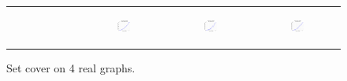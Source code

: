 \begin{figure}[ht]
\begin{tabular}{cccc}
\begin{subfigure}[b]{0.22\textwidth}
			\caption{}
			\label{appfig:validated_CC2G_friendster10M_setcover}
	  \end{subfigure} &
	  \begin{subfigure}[b]{0.22\textwidth}
	  	\includegraphics[width=105pt]{images/validated_CC2G_arabic2005_setcover.pdf}
			\caption{}
			\label{appfig:validated_CC2G_arabic2005_setcover}
	  \end{subfigure} &
	  \begin{subfigure}[b]{0.22\textwidth}
	  	\includegraphics[width=105pt]{images/validated_CC2G_uk2005_setcover.pdf}
			\caption{}
			\label{appfig:validated_CC2G_uk2005_setcover}
	  \end{subfigure} &
	  \begin{subfigure}[b]{0.22\textwidth}
	  	\includegraphics[width=105pt]{images/validated_CC2G_it2004_setcover.pdf}
			\caption{}
			\label{appfig:validated_CC2G_it2004_setcover}
	  \end{subfigure} \\
  \end{tabular}
  \caption{Set cover on 4 real graphs.}
\end{figure}



